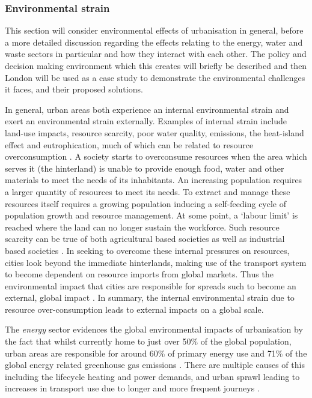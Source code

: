 \subsubsection*{Environmental strain} 
This section will consider environmental effects of urbanisation in general, before a more detailed discussion regarding the effects relating to the energy, water and waste sectors in particular and how they interact with each other. The policy and decision making environment which this creates will briefly be described and then London will be used as a case study to demonstrate the environmental challenges it faces, and their proposed solutions.

In general, urban areas both experience an internal environmental strain and exert an environmental strain externally. Examples of internal strain include land-use impacts, resource scarcity, poor water quality, emissions, the heat-island effect and eutrophication, much of which can be related to resource overconsumption \citep{Cao2011}. A society starts to overconsume resources when the area which serves it (the hinterland) is unable to provide enough food, water and other materials to meet the needs of its inhabitants. An increasing population requires a larger quantity of resources to meet its needs. To extract and manage these resources itself requires a growing population inducing a self-feeding cycle of population  growth and resource management. At some point, a `labour limit' is reached where the land can no longer sustain the workforce. Such resource scarcity can be true of both agricultural based societies as well as industrial based societies \citep{Haberl2001a, Haberl2001b, Gr2003}. In seeking to overcome these internal pressures on resources, cities look beyond the immediate hinterlands, making use of the transport system to become dependent on resource imports from global markets. Thus the environmental impact that cities are responsible for spreads such to become an external, global impact \citep{Agudelo-Vera2011}. In summary, the internal environmental strain due to resource over-consumption leads to external impacts on a global scale.

The \emph{energy} sector evidences the global environmental impacts of urbanisation by the fact that whilst currently home to just over 50\% of the global population, urban areas are responsible for around 60\% of primary energy use and 71\% of the global energy related greenhouse gas emissions \citep{IEA2008}. There are multiple causes of this including the lifecycle heating and power demands, and urban sprawl leading to increases in transport use due to longer and more frequent journeys \citet{Grubler2009}.

